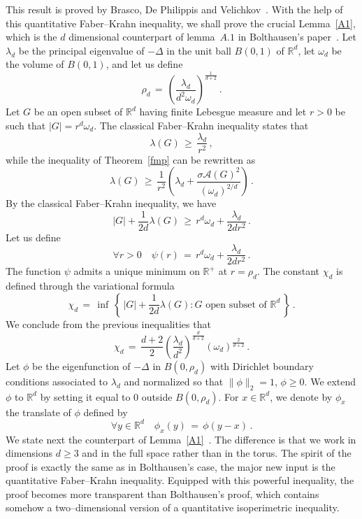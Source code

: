 \documentclass[10pt]{amsart}
\theoremstyle{definition}\newtheorem{defi}[theo]{Definition}\newtheorem{rema}[theo]{Remark}\newtheorem{exam}[theo]{Example}\newtheorem{exem}[theo]{Example}\newtheorem{nota}[theo]{Notation}
\newcommand*\Rd {{\mathbb R^d}}
\newcommand*\R{\mathbb{R}}
\newcommand{\cA}{\mathcal{A}}
\let\oldforall\forall
\renewcommand*{\forall}{\mathrel{\oldforall}}
\begin{document}
This result is proved by Brasco, De Philippis and Velichkov~\cite{BLGV}. With the help of this quantitative Faber--Krahn inequality, we shall prove the crucial Lemma~\ref{A1}, which is the $d$ dimensional counterpart of lemma~$A.1$ in Bolthausen's paper~\cite{BO}. Let $\lambda_d$ be the principal eigenvalue of $-\Delta$ in the unit ball $B(0,1)$ of $\Rd$, let $\omega_d$ be the volume of $B(0,1)$, and let us define
\[
\rho_d\,=\,\left(\frac{\lambda_d}{d^2\omega_d}\right)^{\textstyle\frac{1}{d+2}}\,.
\]
Let $G$ be an open subset of $\Rd$ having finite Lebesgue measure and let $r>0$ be such that $|G|=r^d\omega_d$. The classical Faber--Krahn inequality states that
\begin{equation}\label{cfkr}
\lambda(G)
\,\geq\,
\frac{\lambda_d}{r^{2}}
\,,
\end{equation}
while the inequality of Theorem~\ref{fmp} can be rewritten as
\begin{equation}\label{fkr}
\lambda(G)
\,\geq\,
\frac{1}{r^{2}}\left(\lambda_d+
\frac{ \sigma\cA(G)^2 }{(\omega_d)^{2/d}}
\right)\,.
\end{equation}
By the classical Faber--Krahn inequality, we have
\[
|G|+\frac{1}{2d}\lambda(G)\,\geq\,
r^d\omega_d+ \frac{\lambda_d}{2dr^{2}}\,.
\]
Let us define
\begin{equation}\label{psir}
\forall r>0\quad\psi(r)\,=\, r^d\omega_d+ \frac{\lambda_d}{2dr^{2}}\,.
\end{equation}
The function $\psi$ admits a unique minimum on $\R^+$ at $r=\rho_d$. The constant $\chi_d$ is defined through the variational formula
\[
\chi_d\,=\,\inf\,\left\{\,|G|+\frac{1}{2d}\lambda(G):
G\text{ open subset of }\Rd\,\right\}\,.
\]
We conclude from the previous inequalities that
\[
\chi_d\,=\,\frac{d+2}{2}\left(\frac{\lambda_d}{d^2}\right)^{\textstyle\frac{d}{d+2}}
(\omega_d)^{\textstyle\frac{2}{d+2}}\,.
\]
Let $\phi$ be the eigenfunction of $-\Delta$ in $B(0,\rho_d)$ with Dirichlet boundary conditions associated to $\lambda_d$ and normalized so that $\|\phi\|_2=1$, $\phi\geq 0$. We extend $\phi$ to $\Rd$ by setting it equal to $0$ outside $B(0,\rho_d)$. For $x\in\Rd$, we denote by $\phi_x$ the translate of $\phi$ defined by
\[
\forall y\in\Rd\quad\phi_x(y)\,=\,\phi(y-x)\,.
\]
We state next the counterpart of Lemma~\ref{A1}~\cite[Lemma~A.1 of Bolthausen's paper]{BO}. The difference is that we work in dimensions $d\geq 3$ and in the full space rather than in the torus. The spirit of the proof is exactly the same as in Bolthausen's case, the major new input is the quantitative Faber--Krahn inequality. Equipped with this powerful inequality, the proof becomes more transparent than Bolthausen's proof, which contains somehow a two--dimensional version of a quantitative isoperimetric inequality.
\goodbreak
\end{document}

